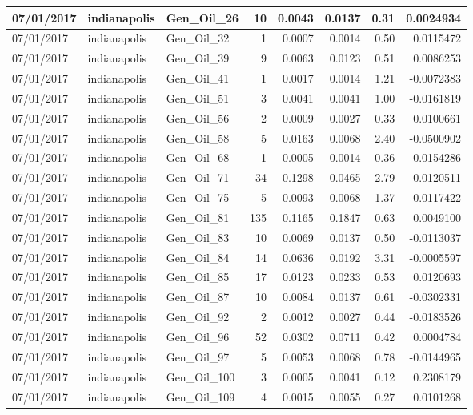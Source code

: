 \documentclass[
  letterpaper,
  DIV=11,
  numbers=noendperiod]{scrartcl}
\begin{document}
\begin{tabular}{l|l|l|r|r|r|r|r}
\hline
07/01/2017 & indianapolis & Gen\_Oil\_26 & 10 & 0.0043 & 0.0137 & 0.31 & 0.0024934\\
\hline
07/01/2017 & indianapolis & Gen\_Oil\_32 & 1 & 0.0007 & 0.0014 & 0.50 & 0.0115472\\
\hline
07/01/2017 & indianapolis & Gen\_Oil\_39 & 9 & 0.0063 & 0.0123 & 0.51 & 0.0086253\\
\hline
07/01/2017 & indianapolis & Gen\_Oil\_41 & 1 & 0.0017 & 0.0014 & 1.21 & -0.0072383\\
\hline
07/01/2017 & indianapolis & Gen\_Oil\_51 & 3 & 0.0041 & 0.0041 & 1.00 & -0.0161819\\
\hline
07/01/2017 & indianapolis & Gen\_Oil\_56 & 2 & 0.0009 & 0.0027 & 0.33 & 0.0100661\\
\hline
07/01/2017 & indianapolis & Gen\_Oil\_58 & 5 & 0.0163 & 0.0068 & 2.40 & -0.0500902\\
\hline
07/01/2017 & indianapolis & Gen\_Oil\_68 & 1 & 0.0005 & 0.0014 & 0.36 & -0.0154286\\
\hline
07/01/2017 & indianapolis & Gen\_Oil\_71 & 34 & 0.1298 & 0.0465 & 2.79 & -0.0120511\\
\hline
07/01/2017 & indianapolis & Gen\_Oil\_75 & 5 & 0.0093 & 0.0068 & 1.37 & -0.0117422\\
\hline
07/01/2017 & indianapolis & Gen\_Oil\_81 & 135 & 0.1165 & 0.1847 & 0.63 & 0.0049100\\
\hline
07/01/2017 & indianapolis & Gen\_Oil\_83 & 10 & 0.0069 & 0.0137 & 0.50 & -0.0113037\\
\hline
07/01/2017 & indianapolis & Gen\_Oil\_84 & 14 & 0.0636 & 0.0192 & 3.31 & -0.0005597\\
\hline
07/01/2017 & indianapolis & Gen\_Oil\_85 & 17 & 0.0123 & 0.0233 & 0.53 & 0.0120693\\
\hline
07/01/2017 & indianapolis & Gen\_Oil\_87 & 10 & 0.0084 & 0.0137 & 0.61 & -0.0302331\\
\hline
07/01/2017 & indianapolis & Gen\_Oil\_92 & 2 & 0.0012 & 0.0027 & 0.44 & -0.0183526\\
\hline
07/01/2017 & indianapolis & Gen\_Oil\_96 & 52 & 0.0302 & 0.0711 & 0.42 & 0.0004784\\
\hline
07/01/2017 & indianapolis & Gen\_Oil\_97 & 5 & 0.0053 & 0.0068 & 0.78 & -0.0144965\\
\hline
07/01/2017 & indianapolis & Gen\_Oil\_100 & 3 & 0.0005 & 0.0041 & 0.12 & 0.2308179\\
\hline
07/01/2017 & indianapolis & Gen\_Oil\_109 & 4 & 0.0015 & 0.0055 & 0.27 & 0.0101268\\

\end{tabular}
\end{document}
